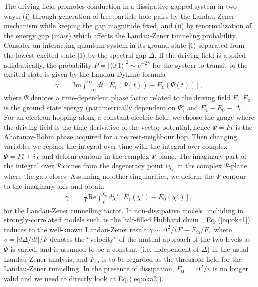 \documentclass[aps,twocolumn,prl,10pt,amsmath,amssymb,nofootinbib,showpacs,superscriptaddress,floatfix]{revtex4-1}
\begin{document}
The driving field promotes conduction in a dissipative gapped system in two ways: (i) through generation of free particle-hole
pairs by the Landau-Zener mechanism while keeping the gap magnitude
fixed, and (ii) by renormalization of the energy gap (mass) which affects the Landau-Zener tunneling probability. 
Consider an interacting quantum system in its ground state $|0\rangle$ separated from the lowest excited state
$|1\rangle$ by the spectral gap $\Delta$. 
If the driving field is applied adiabatically,
the probability $P=|\langle0|1\rangle|^{2}\sim e^{-2\gamma}$
for the system to transit to the excited state is given by the
Landau-Dykhne formula 
\begin{align}
	\gamma & =\text{Im}\int_{-\infty}^{\infty}dt\,[E_{1}(\Psi(t))-E_{0}(\Psi(t))],\label{eq:oka1}
\end{align}
where $\Psi$ denotes a time-dependent phase factor related to the
driving field $F,$ $E_{0}$ is the ground state energy (parametrically
dependent on $\Psi$) and $E_{1}-E_{0}\equiv\Delta$. 
For an electron hopping along a constant electric field, we choose the gauge where
the driving field is the time derivative of
the vector potential, hence $\Psi=Ft$ is the Aharanov-Bohm phase
acquired for a nearest-neighbour hop. Then changing variables we replace 
the integral over time with the integral over complex 
$\Psi=Ft\pm i\chi$ and deform contour in the complex $\Psi$-plane. 
The imaginary part of the integral
over $\Psi$ comes from the degeneracy point $i\chi_{c}$ in the complex
$\Psi$-plane where the gap closes. Assuming no other singularities,
we deform the $\Psi$ contour to the imaginary axis and obtain 
\begin{align}
	\gamma & =\frac{1}{F}\text{Re}\int_{\chi}^{\chi_{c}}d\chi'[E_{1}(\chi')-E_{0}(\chi')],\label{eq:oka2}
\end{align}
for the Landau-Zener tunnelling factor. In non-dissipative models, including in strongly-correlated models such
as the half-filled Hubbard chain~\cite{oka},
Eq.\,(\ref{eq:oka1}) reduces to the well-known Landau-Zener result $\gamma\sim\Delta^{2}/vF\equiv F_{\text{th}}/F,$
where $v=|d\Delta/dt|/F$ denotes the ``velocity'' of the mutual approach of
the two levels as $\Psi$ is varied, and is assumed to be a constant
(i.e. independent of $\Delta$) in the usual Landau-Zener analysis, and $F_{\text{th}}$ is to be regarded as the threshold
field for the Landau-Zener tunnelling. In the presence of dissipation, $F_{\text{th}} = \Delta^2/v$ is no longer valid and 
we need to directly look at Eq.\,(\ref{eq:oka2}).
\end{document}
